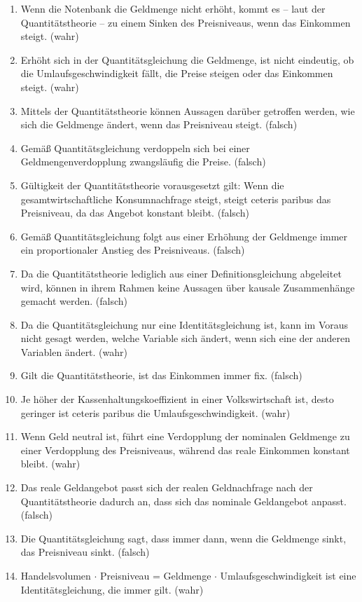 \documentclass{scrartcl}
\begin{document}
\begin{enumerate}
	\item Wenn die Notenbank die Geldmenge nicht erhöht, kommt es – laut der Quantitätstheorie – zu einem Sinken des Preisniveaus, wenn das Einkommen steigt. (wahr)
	\item Erhöht sich in der Quantitätsgleichung die Geldmenge, ist nicht eindeutig, ob die Umlaufsgeschwindigkeit fällt, die Preise steigen oder das Einkommen steigt. (wahr)
	\item Mittels der Quantitätstheorie können Aussagen darüber getroffen werden, wie sich die Geldmenge ändert, wenn das Preisniveau steigt. (falsch)
	\item Gemäß Quantitätsgleichung verdoppeln sich bei einer Geldmengenverdopplung zwangsläufig die Preise. (falsch)
	\item Gültigkeit der Quantitätstheorie vorausgesetzt gilt: Wenn die gesamtwirtschaftliche Konsumnachfrage steigt, steigt ceteris paribus das Preisniveau, da das Angebot konstant bleibt. (falsch)
	\item Gemäß Quantitätsgleichung folgt aus einer Erhöhung der Geldmenge immer ein proportionaler Anstieg des Preisniveaus. (falsch)
	\item Da die Quantitätstheorie lediglich aus einer Definitionsgleichung abgeleitet wird, können in ihrem Rahmen keine Aussagen über kausale Zusammenhänge gemacht werden. (falsch)
	\item Da die Quantitätsgleichung nur eine Identitätsgleichung ist, kann im Voraus nicht gesagt werden, welche Variable sich ändert, wenn sich eine der anderen Variablen ändert. (wahr)
	\item Gilt die Quantitätstheorie, ist das Einkommen immer fix. (falsch)
	\item Je höher der Kassenhaltungskoeffizient in einer Volkswirtschaft ist, desto geringer ist ceteris paribus die Umlaufsgeschwindigkeit. (wahr)
	\item Wenn Geld neutral ist, führt eine Verdopplung der nominalen Geldmenge zu einer Verdopplung des Preisniveaus, während das reale Einkommen konstant bleibt. (wahr)
	\item Das reale Geldangebot passt sich der realen Geldnachfrage nach der Quantitätstheorie dadurch an, dass sich das nominale Geldangebot anpasst. (falsch)
	\item Die Quantitätsgleichung sagt, dass immer dann, wenn die Geldmenge sinkt, das Preisniveau sinkt. (falsch)
	\item Handelsvolumen $\cdot$ Preisniveau = Geldmenge $\cdot$ Umlaufsgeschwindigkeit ist eine Identitätsgleichung, die immer gilt. (wahr)
\end{enumerate}
\end{document}
